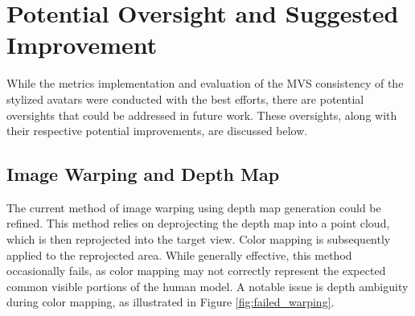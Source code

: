 \section{Potential Oversight and Suggested Improvement}
\label{sec:oversight}
While the metrics implementation and evaluation of the MVS consistency of the stylized avatars were conducted with the best efforts, there are potential oversights that could be addressed in future work. These oversights, along with their respective potential improvements, are discussed below.

\subsection{Image Warping and Depth Map}
The current method of image warping using depth map generation could be refined. This method relies on deprojecting the depth map into a point cloud, which is then reprojected into the target view. Color mapping is subsequently applied to the reprojected area. While generally effective, this method occasionally fails, as color mapping may not correctly represent the expected common visible portions of the human model. A notable issue is depth ambiguity during color mapping, as illustrated in Figure \ref{fig:failed_warping}.

